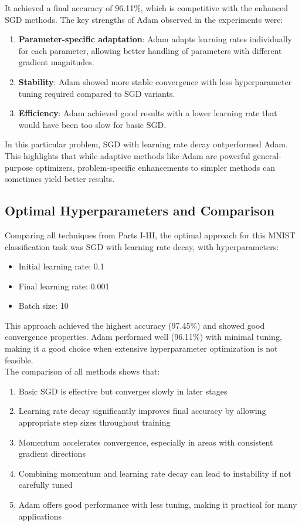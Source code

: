 \documentclass{article}
\begin{document}
\noindent It achieved a final accuracy of 96.11\%, which is competitive with the enhanced SGD methods. The key strengths of Adam observed in the experiments were:
\begin{enumerate}
    \item \textbf{Parameter-specific adaptation}: Adam adapts learning rates individually 
    for each parameter, allowing better handling of parameters with different gradient magnitudes.
    \item \textbf{Stability}: Adam showed more stable convergence with less 
    hyperparameter tuning required compared to SGD variants.
    \item \textbf{Efficiency}: Adam achieved good results with a lower learning 
    rate that would have been too slow for basic SGD.
\end{enumerate}

In this particular problem, SGD with learning rate decay outperformed Adam. This highlights 
that while adaptive methods like Adam are powerful general-purpose optimizers, problem-specific 
enhancements to simpler methods can sometimes yield better results.

\subsection{Optimal Hyperparameters and Comparison}

Comparing all techniques from Parts I-III, the optimal approach for this MNIST classification 
task was SGD with learning rate decay, with hyperparameters:
\begin{itemize}
    \item Initial learning rate: 0.1
    \item Final learning rate: 0.001
    \item Batch size: 10
\end{itemize}

This approach achieved the highest accuracy (97.45\%) and showed good convergence properties. 
Adam performed well (96.11\%) with minimal tuning, making it a good choice when extensive 
hyperparameter optimization is not feasible. \\

\noindent The comparison of all methods shows that:
\begin{enumerate}
    \item Basic SGD is effective but converges slowly in later stages
    \item Learning rate decay significantly improves final accuracy by allowing 
    appropriate step sizes throughout training
    \item Momentum accelerates convergence, especially in areas with 
    consistent gradient directions
    \item Combining momentum and learning rate decay can lead to 
    instability if not carefully tuned
    \item Adam offers good performance with less tuning, making it 
    practical for many applications
\end{enumerate}
\end{document}
